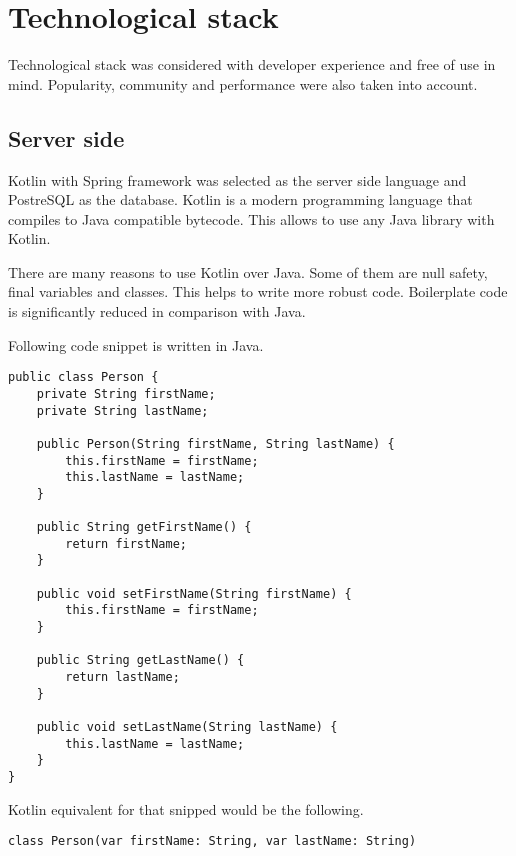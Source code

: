 
\section{Technological stack}\label{sec:technological-stack}

Technological stack was considered with developer experience and free of use in mind.
Popularity, community and performance were also taken into account.

\subsection{Server side}\label{subsec:ts-server-side}

Kotlin with Spring framework was selected as the server side language and PostreSQL as the database.\cite{kotlin, spring, postgresql}
Kotlin is a modern programming language that compiles to Java compatible bytecode.
This allows to use any Java library with Kotlin.

There are many reasons to use Kotlin over Java.
Some of them are null safety, final variables and classes.
This helps to write more robust code.
Boilerplate code is significantly reduced in comparison with Java.

Following code snippet is written in Java.\\

\begin{Verbatim}[frame=single]
public class Person {
    private String firstName;
    private String lastName;

    public Person(String firstName, String lastName) {
        this.firstName = firstName;
        this.lastName = lastName;
    }

    public String getFirstName() {
        return firstName;
    }

    public void setFirstName(String firstName) {
        this.firstName = firstName;
    }

    public String getLastName() {
        return lastName;
    }

    public void setLastName(String lastName) {
        this.lastName = lastName;
    }
}
\end{Verbatim}

Kotlin equivalent for that snipped would be the following.\\
\begin{Verbatim}[frame=single]
class Person(var firstName: String, var lastName: String)
\end{Verbatim}

